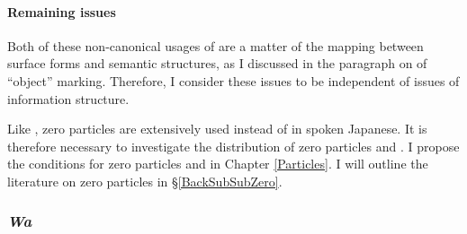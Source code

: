 %
%

\paragraph{Remaining issues}

Both of these non-canonical usages of  are a matter of the mapping
between surface forms and semantic structures,
as I discussed in the paragraph on  of ``object'' marking.
Therefore, I consider these issues to be independent of
issues of information structure.

Like ,
zero particles are extensively used instead of  in spoken Japanese.
It is therefore necessary to investigate the distribution of zero particles and .
I propose the conditions for zero particles and  in Chapter \ref{Particles}.
I will outline the literature on zero particles in \S \ref{BackSubSubZero}.




\subsubsection{\textit{Wa}}\label{Back:GeneralChar:Wa}



